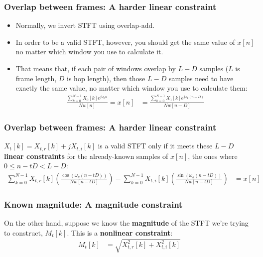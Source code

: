 \documentclass{beamer}
\begin{document}
\begin{frame}
  \frametitle{Overlap between frames: A harder linear constraint}
  \begin{itemize}
  \item Normally, we invert STFT using overlap-add.
  \item In order to be a valid STFT, however, you should get the same
    value of $x[n]$ no matter which window you use to calculate it.
  \item That means that, if each pair of windows overlap by $L-D$
    samples ($L$ is frame length, $D$ is hop length), then those $L-D$
    samples need to have exactly the same value, no matter which
    window you use to calculate them:
    \begin{align*}
      \frac{\sum_{k=0}^{N-1}X_0[k]e^{j\omega_k n}}{Nw[n]} = x[n] 
      &= \frac{\sum_{k=0}^{N-1}X_1[k]e^{j\omega_k(n-D)}}{Nw[n-D]}
    \end{align*}
  \end{itemize}
\end{frame}

\begin{frame}
  \frametitle{Overlap between frames: A harder linear constraint}
  
  $X_t[k]=X_{t,r}[k]+jX_{t,i}[k]$
  is a valid STFT only if it meets these $L-D$ {\bf linear
    constraints} for the already-known samples of $x[n]$, the ones
  where $0\le n-tD<L-D$:
  \begin{align*}
    \sum_{k=0}^{N-1}X_{t,r}[k] \left(\frac{\cos(\omega_k (n-tD))}{Nw[n-tD]}\right)
    -\sum_{k=0}^{N-1}X_{t,i}[k]\left(\frac{\sin(\omega_k(n-tD))}{Nw[n-tD]}\right) &= x[n]
  \end{align*}
\end{frame}

\begin{frame}
  \frametitle{Known magnitude: A magnitude constraint}

  On the other hand, suppose we know the {\bf magnitude} of the STFT
  we're trying to construct, $M_t[k]$.  This is a {\bf nonlinear
    constraint}:
  \begin{align*}
    M_t[k] &= \sqrt{X_{t,r}^2[k]+X_{t,i}^2[k]}
  \end{align*}
\end{frame}
\end{document}
